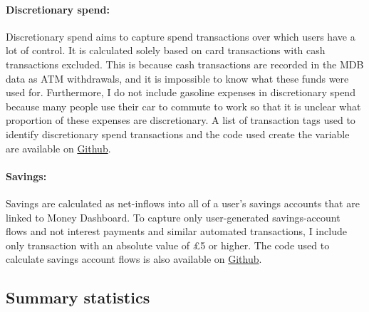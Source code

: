 \paragraph{Discretionary spend:} Discretionary spend aims to capture spend
transactions over which users have a lot of control. It is calculated solely
based on card transactions with cash transactions excluded. This is because
cash transactions are recorded in the MDB data as ATM withdrawals, and it is
impossible to know what these funds were used for. Furthermore, I do not
include gasoline expenses in discretionary spend because many people use their
car to commute to work so that it is unclear what proportion of these expenses
are discretionary. A list of transaction tags used to identify discretionary
spend transactions and the code used create the variable are available on
\href{https://github.com/fabiangunzinger/mdb_eval/blob/f31bfcd7a330188cdd27968d41957ebf5b454099/src/data/aggregators.py\#L389}{Github}.

\paragraph{Savings:} Savings are calculated as net-inflows into all of a user's
savings accounts that are linked to Money Dashboard. To capture only
user-generated savings-account flows and not interest payments and similar
automated transactions, I include only transaction with an absolute value of
\pounds5 or higher. The code used to calculate savings account flows is also
available on
\href{https://github.com/fabiangunzinger/mdb_eval/blob/f31bfcd7a330188cdd27968d41957ebf5b454099/src/data/aggregators.py#L89}{Github}.


\subsection{Summary statistics}%
\label{sub:summary_statistics}

